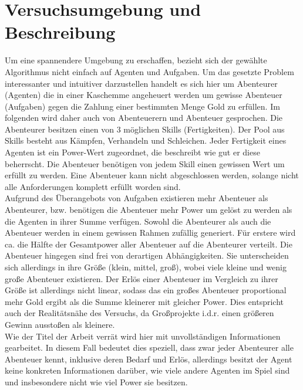 \documentclass[fleqn,10pt]{SelfArx} %
\begin{document}

\section{Versuchsumgebung und Beschreibung}
\label{sec:Umgebung}

Um eine spannendere Umgebung zu erschaffen, bezieht sich der gewählte Algorithmus nicht einfach auf Agenten und Aufgaben. Um das gesetzte Problem interessanter und intuitiver darzustellen handelt es sich hier um Abenteurer (Agenten) die in einer Kaschemme angeheuert werden um gewisse Abenteuer (Aufgaben) gegen die Zahlung einer bestimmten Menge Gold zu erfüllen. Im folgenden wird daher auch von Abenteuerern und Abenteuer gesprochen. Die Abenteurer besitzen einen von 3 möglichen Skills (Fertigkeiten). Der Pool aus Skills besteht aus Kämpfen, Verhandeln und Schleichen. Jeder Fertigkeit eines Agenten ist ein Power-Wert zugeordnet, die beschreibt wie gut er diese beherrscht. Die Abenteuer benötigen von jedem Skill einen gewissen Wert um erfüllt zu werden. Eine Abenteuer kann nicht abgeschlossen werden, solange nicht alle Anforderungen komplett erfüllt worden sind.\\
Aufgrund des Überangebots von Aufgaben existieren mehr Abenteuer als Abenteurer, bzw. benötigen die Abenteuer mehr Power um gelöst zu werden als die Agenten in ihrer Summe verfügen. Sowohl die Abenteurer als auch die Abenteuer werden in einem gewissen Rahmen zufällig generiert. Für erstere wird ca. die Hälfte der Gesamtpower aller Abenteuer auf die Abenteurer verteilt. Die Abenteuer hingegen sind frei von derartigen Abhängigkeiten. Sie unterscheiden sich allerdings in ihre Größe (klein, mittel, groß), wobei viele kleine und wenig große Abenteuer existieren. Der Erlös einer Abenteuer im Vergleich zu ihrer Größe ist allerdings nicht linear, sodass das ein großes Abenteuer proportional mehr Gold ergibt als die Summe kleinerer mit gleicher Power. Dies entspricht auch der Realitätsnähe des Versuchs, da Großprojekte i.d.r. einen größeren Gewinn ausstoßen als kleinere.\\
Wie der Titel der Arbeit verrät wird hier mit unvollständigen Informationen gearbeitet. In diesem Fall bedeutet dies speziell, dass zwar jeder Abenteurer alle Abenteuer kennt, inklusive deren Bedarf und Erlös, allerdings besitzt der Agent keine konkreten Informationen darüber, wie viele andere Agenten im Spiel sind und insbesondere nicht wie viel Power sie besitzen.\\ 
\end{document}

